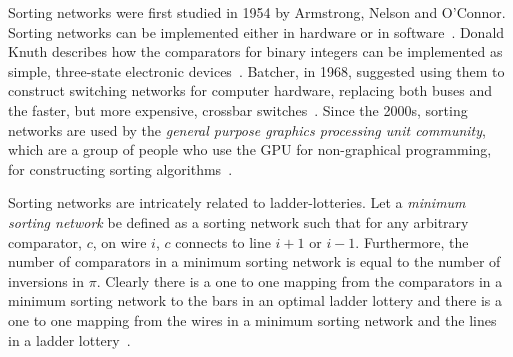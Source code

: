 Sorting networks were first studied in 1954 by Armstrong, Nelson and O'Connor. 
Sorting networks can be implemented either in hardware or in software~\cite{A18}.
Donald Knuth describes how the comparators for binary integers can be implemented as simple, 
three-state electronic devices~\cite{A18}. Batcher, in 1968, 
suggested using them to construct switching networks for computer hardware, replacing 
both buses and the faster, but more expensive, crossbar switches~\cite{A27}. Since the 2000s, sorting networks are used by the 
\emph{general purpose graphics processing unit community}, which are a group of people who use 
the GPU for non-graphical programming, for constructing sorting algorithms~\cite{A28}.\par 
Sorting networks are intricately related to ladder-lotteries. Let a \emph{minimum sorting network} be defined 
as a sorting network such that for any arbitrary comparator, $c$, on wire $i$, $c$ connects to line $i+1$ or $i-1$. Furthermore, 
the number of comparators in a minimum sorting network is equal to the number of inversions in $\pi$. Clearly there is a 
one to one mapping from the comparators in a minimum sorting network to the bars in an optimal ladder lottery and there 
is a one to one mapping from the wires in a minimum sorting network and the lines in a ladder lottery~\cite{A29}. 


 
